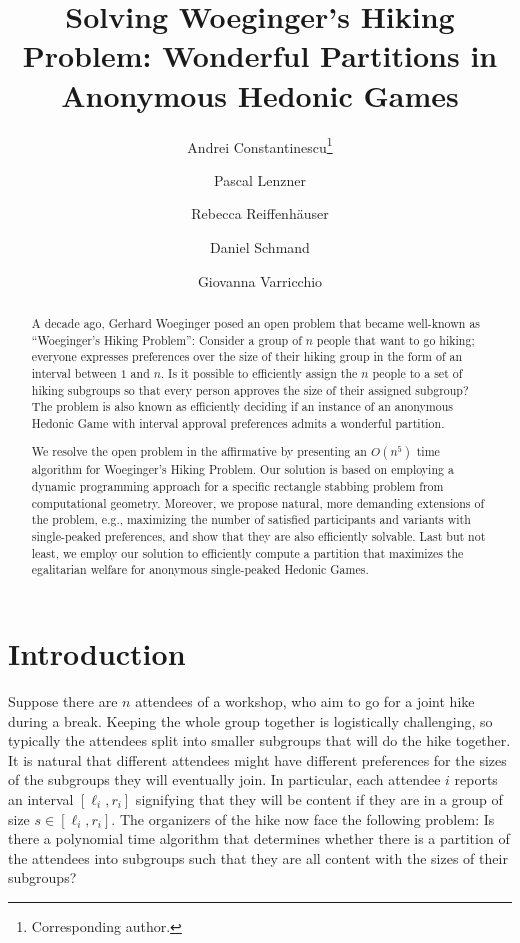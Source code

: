 \documentclass[a4paper,UKenglish,cleveref, autoref, thm-restate]{lipics-v2021}
\title{Solving Woeginger's Hiking Problem: Wonderful Partitions in Anonymous Hedonic Games}
\author{Andrei Constantinescu\footnote{Corresponding author.}}{ETH Zürich, Zürich, Switzerland \and \url{https://andrei1998.github.io/}}{aconstantine@ethz.ch}{https://orcid.org/0009-0005-1708-9376}{}
\author{Pascal Lenzner}{Hasso Plattner Institute, University of Potsdam, Potsdam, Germany}{pascal.lenzner@hpi.de}{https://orcid.org/0000-0002-3010-1019}{}
\author{Rebecca Reiffenhäuser}{University of Amsterdam, Amsterdam, The Netherlands}{r.e.m.reiffenhauser@uva.nl}{https://orcid.org/0000-0002-0959-2589}{}
\author{Daniel Schmand}{University of Bremen, Bremen, Germany}{schmand@uni-bremen.de}{https://orcid.org/0000-0001-7776-3426}{}
\author{Giovanna Varricchio}{University of Calabria, Rende, Italy}{giovanna.varricchio@unical.it}{https://orcid.org/0000-0001-6839-8551}{The author is grateful for the support by the PNRR MUR project FAIR - Future AI Research (PE00000013), and the DFG, German Research Foundation, grant (Ho 3831/5-1).}
\begin{document}
\maketitle
\begin{abstract}
A decade ago, Gerhard Woeginger posed an open problem that became well-known as ``Woeginger's Hiking Problem'': Consider a group of $n$ people that want to go hiking; everyone expresses preferences over the size of their hiking group in the form of an interval between $1$ and $n$. Is it possible to efficiently assign the $n$ people to a set of hiking subgroups so that every person approves the size of their assigned subgroup? The problem is also known as efficiently deciding if an instance of an anonymous Hedonic Game with interval approval preferences admits a wonderful partition.

We resolve the open problem in the affirmative by presenting an $O(n^5)$ time algorithm for Woeginger's Hiking Problem. Our solution is based on employing a dynamic programming approach for a specific rectangle stabbing problem from computational geo\-metry. Moreover, we propose natural, more demanding extensions of the problem, e.g., maximizing the number of satisfied participants and variants with single-peaked preferences, and show that they are also efficiently solvable.
Last but not least, we employ our solution to efficiently compute a partition that maximizes the egalitarian welfare for anonymous single-peaked Hedonic Games.
\end{abstract}

\section{Introduction}
Suppose there are $n$ attendees of a workshop, who aim to go for a joint hike during a break. Keeping the whole group together is logistically challenging, so typically the attendees split into smaller subgroups that will do the hike together. 
It is natural that different attendees might have different preferences for the sizes of the subgroups they will eventually join. In particular, each attendee $i$ reports an interval $[\ell_i, r_i]$ signifying that they will be content if they are in a group of size $s \in [\ell_i, r_i]$. The organizers of the hike now face the following problem: Is there a polynomial time algorithm that determines whether there is a partition of the attendees into subgroups such that they are all content with the sizes of their subgroups?
\end{document}

